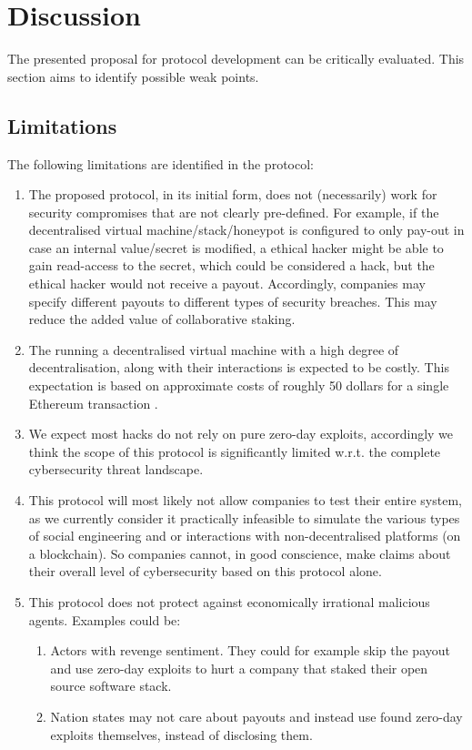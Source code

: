 \section{Discussion}
\label{sec:discussion}
The presented proposal for protocol development can be critically evaluated. This section aims to identify possible weak points.
\subsection{Limitations}
The following limitations are identified in the protocol:
\begin{enumerate}
    \item The proposed protocol, in its initial form, does not (necessarily) work for security compromises that are not clearly pre-defined. For example, if the decentralised virtual machine/stack/honeypot is configured to only pay-out in case an internal value/secret is modified, a ethical hacker might be able to gain read-access to the secret, which could be considered a hack, but the ethical hacker would not receive a payout. Accordingly, companies may specify different payouts to different types of security breaches. This may reduce the added value of collaborative staking.
    \item The running a decentralised virtual machine with a high degree of decentralisation, along with their interactions is expected to be costly. This expectation is based on approximate costs of roughly 50 dollars for a single Ethereum transaction \cite{todo}.
    \item We expect most hacks do not rely on pure zero-day exploits, accordingly we think the scope of this protocol is significantly limited w.r.t. the complete cybersecurity threat landscape.
    \item This protocol will most likely not allow companies to test their entire system, as we currently consider it practically infeasible to simulate the various types of social engineering and or interactions with non-decentralised platforms (on a blockchain). So companies cannot, in good conscience, make claims about their overall level of cybersecurity based on this protocol alone.
    \item This protocol does not protect against economically irrational malicious agents. Examples could be:
    \begin{enumerate}
        \item Actors with revenge sentiment. They could for example skip the payout and use zero-day exploits to hurt a company that staked their open source software stack.
        \item Nation states may not care about payouts and instead use found zero-day exploits themselves, instead of disclosing them.
    \end{enumerate}
\end{enumerate}

